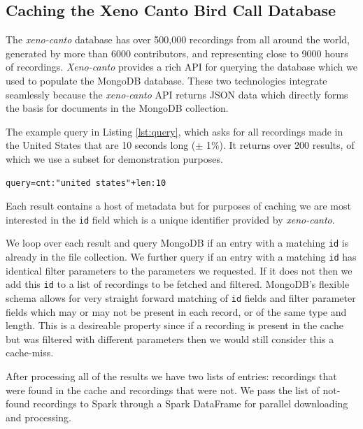 \documentclass[conference,twoside]{IEEEtran}
\newcommand{\code}[1]{\texttt{#1}}
\begin{document}
\subsection{Caching the Xeno Canto Bird Call Database}
The \textit{xeno-canto} database has over 500,000 recordings from all around the world, generated by more than 6000 contributors, and representing close to 9000 hours of recordings\cite{xenocanto}. \textit{Xeno-canto} provides a rich API for querying the database which we used to populate the MongoDB database. These two technologies integrate seamlessly because the \textit{xeno-canto} API returns JSON data which directly forms the basis for documents in the MongoDB collection.

The example query in Listing \ref{lst:query}, which asks for all recordings made in the United States that are 10 seconds long ($\pm$ 1\%). It returns over 200 results, of which we use a subset for demonstration purposes.
\begin{lstlisting}[language=Txt, caption={\textit{Xeno-canto} Query}, label={lst:query}]
query=cnt:"united states"+len:10
\end{lstlisting}

Each result contains a host of metadata but for purposes of caching we are most interested in the \code{id} field which is a unique identifier provided by \textit{xeno-canto}.

We loop over each result and query MongoDB if an entry with a matching \code{id} is already in the file collection. We further query if an entry with a matching \code{id} has identical filter parameters to the parameters we requested. If it does not then we add this \code{id} to a list of recordings to be fetched and filtered. MongoDB's flexible schema allows for very straight forward matching of \code{id} fields and filter parameter fields which may or may not be present in each record, or of the same type and length. This is a desireable property since if a recording is present in the cache but was filtered with different parameters then we would still consider this a cache-miss.

After processing all of the results we have two lists of entries: recordings that were found in the cache and recordings that were not. We pass the list of not-found recordings to Spark through a Spark DataFrame for parallel downloading and processing.
\end{document}
